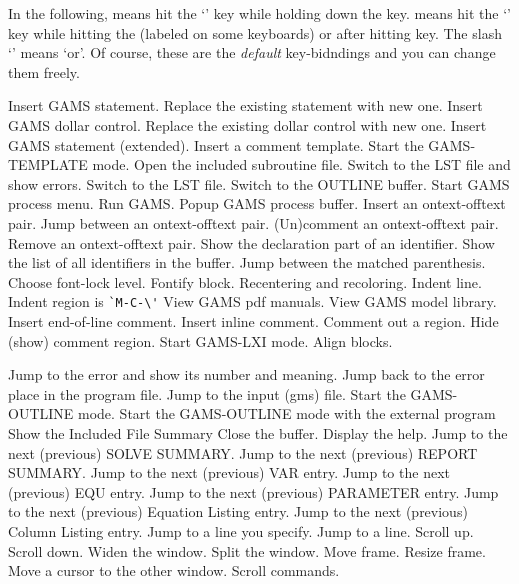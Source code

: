 \documentclass{article}
\begin{document}

In the following,  means hit the `' key while holding down
the  key.  means hit the `' key while hitting
the  (labeled  on some keyboards) or after hitting
 key.  The slash `\kbd{/}' means `or'.  Of course, these are
the {\it default} key-bidndings and you can change them freely.



 Insert GAMS statement.
 Replace the existing statement with new one.
 Insert GAMS dollar control.
 Replace the existing dollar control with new one.
 Insert GAMS statement (extended).
 Insert a comment template.
 Start the GAMS-TEMPLATE mode.
 Open the included subroutine file.
\key{} 
 Switch to the LST file and show errors.
 Switch to the LST file.
  Switch to the OUTLINE buffer.
\key{} 
  Start GAMS process menu.
  Run GAMS.
  Popup GAMS process buffer.
\key{} 
  Insert an ontext-offtext pair.
  Jump between an ontext-offtext pair.
  (Un)comment an ontext-offtext pair.
  Remove an ontext-offtext pair.
\key{} 
  Show the declaration part of an identifier.
  Show the list of all identifiers in the buffer.
  Jump between the matched parenthesis.
  Choose font-lock level.
  Fontify block.
  Recentering and recoloring.
  Indent line.
\key{} Indent region is \verb|`M-C-\'|
  View GAMS pdf manuals.
  View GAMS model library.
  Insert end-of-line comment.
  Insert inline comment.
  Comment out a region.
  Hide (show) comment region.
  Start GAMS-LXI mode.
  Align blocks.



   Jump to the error and show its number and meaning.
  Jump back to the error place in the program file.
  Jump to the input (gms) file.
  Start the GAMS-OUTLINE mode.
  Start the GAMS-OUTLINE mode with the external program
  Show the Included File Summary
\key{} 
  Close the buffer.
  Display the help.
\key{} 
  Jump to the next (previous) SOLVE SUMMARY.
  Jump to the next (previous) REPORT SUMMARY.
  Jump to the next (previous) VAR entry.
  Jump to the next (previous) EQU entry.
  Jump to the next (previous) PARAMETER entry.
  Jump to the next (previous) Equation Listing entry.
  Jump to the next (previous) Column Listing entry.
  Jump to a line you specify.
  Jump to a line.
\key{} 
  Scroll up.
  Scroll down.
  Widen the window.
  Split the window.
  Move frame.
  Resize frame.
  Move a cursor to the other window.
\key{} 
          Scroll commands.
\end{document}
